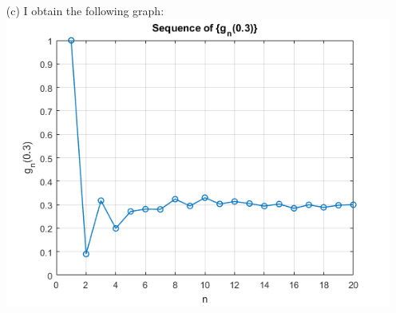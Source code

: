 \documentclass[11pt]{article}
\begin{document}
\begin{itemize}
	\item[(c)]
	I obtain the following graph:\\
	\includegraphics{g_n_seq.png}\pagebreak
\end{itemize}
\end{document}
